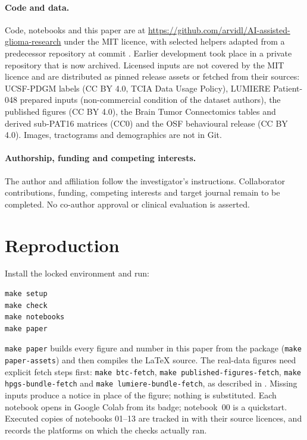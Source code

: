 \documentclass[11pt,a4paper]{article}
\begin{document}
\paragraph{Code and data.}
Code, notebooks and this paper are at
\url{https://github.com/arvidl/AI-assisted-glioma-research} under the MIT
licence, with selected helpers adapted from a predecessor repository at
commit . Earlier development took
place in a private repository that is now archived. Licensed inputs are not
covered by the MIT licence and are distributed as pinned release assets or
fetched from their sources: UCSF-PDGM labels (CC BY 4.0, TCIA Data Usage
Policy), LUMIERE Patient-048 prepared inputs (non-commercial condition of the
dataset authors), the published figures (CC BY 4.0), the Brain Tumor
Connectomics tables and derived sub-PAT16 matrices (CC0) and the OSF
behavioural release (CC BY 4.0). Images, tractograms and demographics are
not in Git.

\paragraph{Authorship, funding and competing interests.}
The author and affiliation follow the investigator's instructions.
Collaborator contributions, funding, competing interests and target journal
remain to be completed. No co-author approval or clinical evaluation is
asserted.

\appendix
\section{Reproduction}

Install the locked environment and run:
\begin{verbatim}
make setup
make check
make notebooks
make paper
\end{verbatim}
\texttt{make paper} builds every figure and number in this paper from the
package (\texttt{make paper-assets}) and then compiles the LaTeX source. The
real-data figures need explicit fetch steps first: \texttt{make btc-fetch},
\texttt{make published-figures-fetch}, \texttt{make hpgs-bundle-fetch} and
\texttt{make lumiere-bundle-fetch}, as described in .
Missing inputs produce a notice in place of the figure; nothing is
substituted. Each notebook opens in Google Colab from its badge; notebook~00
is a quickstart. Executed copies of notebooks 01--13 are tracked in
 with their source licences, and
 records the platforms on which the checks actually
ran.



\end{document}

